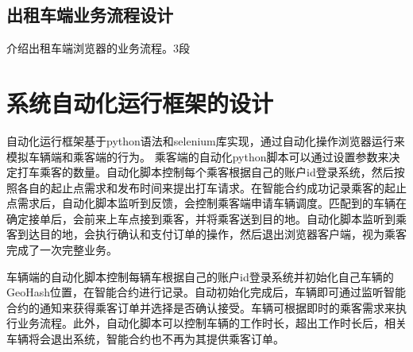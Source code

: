 \subsection{出租车端业务流程设计}
介绍出租车端浏览器的业务流程。3段

\section{系统自动化运行框架的设计}
自动化运行框架基于python语法和selenium库实现，通过自动化操作浏览器运行来模拟车辆端和乘客端的行为。
乘客端的自动化python脚本可以通过设置参数来决定打车乘客的数量。自动化脚本控制每个乘客根据自己的账户id登录系统，然后按照各自的起止点需求和发布时间来提出打车请求。在智能合约成功记录乘客的起止点需求后，自动化脚本监听到反馈，会控制乘客端申请车辆调度。匹配到的车辆在确定接单后，会前来上车点接到乘客，并将乘客送到目的地。自动化脚本监听到乘客到达目的地，会执行确认和支付订单的操作，然后退出浏览器客户端，视为乘客完成了一次完整业务。

车辆端的自动化脚本控制每辆车根据自己的账户id登录系统并初始化自己车辆的GeoHash位置，在智能合约进行记录。自动初始化完成后，车辆即可通过监听智能合约的通知来获得乘客订单并选择是否确认接受。车辆可根据即时的乘客需求来执行业务流程。此外，自动化脚本可以控制车辆的工作时长，超出工作时长后，相关车辆将会退出系统，智能合约也不再为其提供乘客订单。

